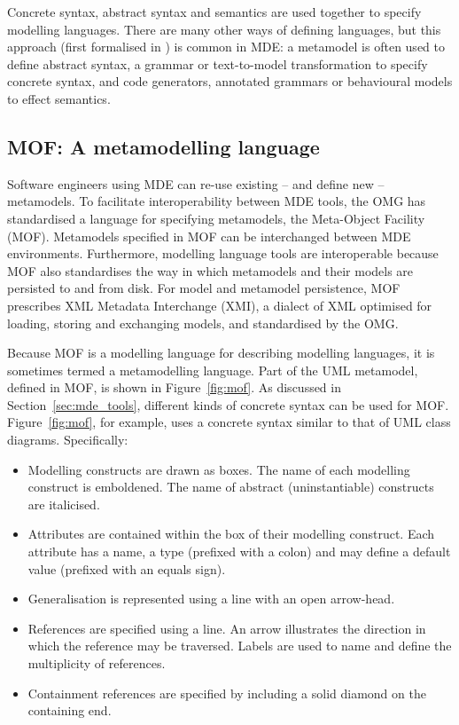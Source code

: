 Concrete syntax, abstract syntax and semantics are used together to specify modelling languages. There are many other ways of defining languages, but this approach (first formalised in \cite{alvarez01mml}) is common in MDE: a metamodel is often used to define abstract syntax, a grammar or text-to-model transformation to specify concrete syntax, and code generators, annotated grammars or behavioural models to effect semantics.

\subsection{MOF: A metamodelling language}
\label{subsec:mof}
Software engineers using MDE can re-use existing -- and define new -- metamodels. To facilitate interoperability between MDE tools, the OMG has standardised a language for specifying metamodels, the Meta-Object Facility (MOF). Metamodels specified in MOF can be interchanged between MDE environments. Furthermore, modelling language tools are interoperable because MOF also standardises the way in which metamodels and their models are persisted to and from disk. For model and metamodel persistence, MOF prescribes XML Metadata Interchange (XMI), a dialect of XML optimised for loading, storing and exchanging models, and standardised by the OMG.

Because MOF is a modelling language for describing modelling languages, it is sometimes termed a metamodelling language. Part of the UML metamodel, defined in MOF, is shown in Figure~\ref{fig:mof}. As discussed in Section~\ref{sec:mde_tools}, different kinds of concrete syntax can be used for MOF. Figure~\ref{fig:mof}, for example, uses a concrete syntax similar to that of UML class diagrams. Specifically:

\begin{itemize}
 \item Modelling constructs are drawn as boxes. The name of each modelling construct is emboldened. The name of abstract (uninstantiable) constructs are italicised.
 \item Attributes are contained within the box of their modelling construct. Each attribute has a name, a type (prefixed with a colon) and may define a default value (prefixed with an equals sign).
 \item Generalisation is represented using a line with an open arrow-head.
 \item References are specified using a line. An arrow illustrates the direction in which the reference may be traversed. Labels are used to name and define the multiplicity of references.
 \item Containment references are specified by including a solid diamond on the containing end.
\end{itemize}

